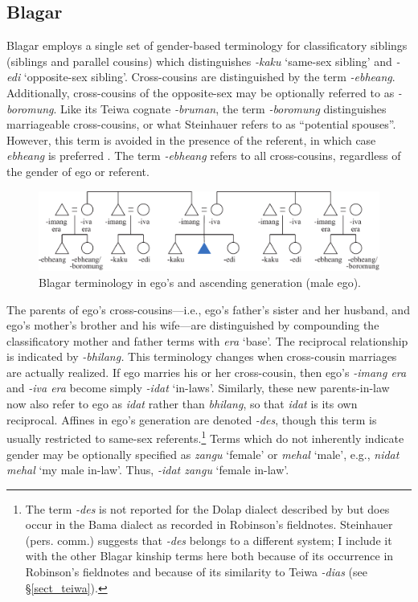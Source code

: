 \subsection{Blagar}\label{sect_blagar}
Blagar employs a single set of gender-based terminology for classificatory siblings (siblings and parallel cousins) which distinguishes \textit{-kaku} `same-sex sibling' and \textit{-edi} `opposite-sex sibling'. Cross-cousins are distinguished by the term \textit{-ebheang}. Additionally, cross-cousins of the opposite-sex may be optionally referred to as \textit{-boromung}. Like its Teiwa cognate \textit{-bruman}, the term \textit{-boromung} distinguishes marriageable cross-cousins, or what Steinhauer refers to as ``potential spouses''. However, this term is avoided in the presence of the referent, in which case \textit{ebheang} is preferred \citep[156]{Steinhauer1993}. The term \textit{-ebheang} refers to all cross-cousins, regardless of the gender of ego or referent.


\begin{figure}
\includegraphics[width=\textwidth]{figures/Holton_ch5_fig7.pdf}
\caption{Blagar terminology in ego's and ascending generation (male ego). }
\label{fig:5:figure_blagar}
\end{figure}  
 

 

The parents of ego's cross-cousins---i.e., ego's father's sister and her husband, and ego's mother's brother and his wife---are distinguished by compounding the classificatory mother and father terms with \textit{era} `base'. The reciprocal relationship is indicated by \textit{-bhilang.} This terminology changes when cross-cousin marriages are actually realized. If ego marries his or her cross-cousin, then ego's \textit{-imang era} and \textit{-iva era} become simply \textit{-idat} `in-laws'. Similarly, these new parents-in-law now also refer to ego as \textit{idat} rather than \textit{bhilang}, so that \textit{idat} is its own reciprocal. Affines in ego's generation are denoted \textit{-des}, though this term is usually restricted to same-sex referents.\footnote{{ }  The term \textit{-des} is not reported for the Dolap dialect described by \citet{Steinhauer1993} but does occur in the Bama dialect as recorded in Robinson's fieldnotes. Steinhauer (pers. comm.) suggests that \textit{-des} belongs to a different system; I include it with the other Blagar kinship terms here both because of its occurrence in Robinson's fieldnotes and because of its similarity to Teiwa \textit{-dias} (see {\S}\ref{sect_teiwa}).} Terms which do not inherently indicate gender may be optionally specified as \textit{zangu} `female' or \textit{mehal} `male', e.g., \textit{nidat mehal} `my male in-law'. Thus, \textit{-idat zangu} `female in-law'.




